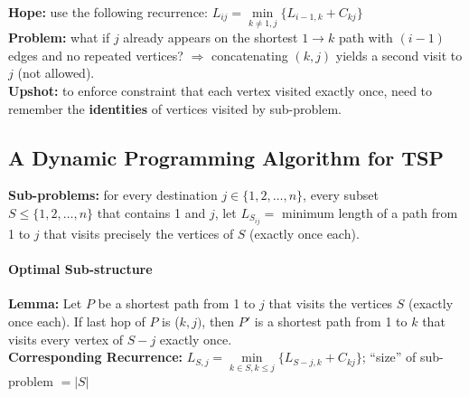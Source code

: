 \documentclass{scrartcl}
\begin{document}
{\bf Hope: } use the following recurrence: $L_{ij} =\min \limits_{k \neq 1, j}
\{L_{i-1,k} + C_{kj}\}$ \\
{\bf Problem: } what if $j$ already appears on the shortest $1 \rightarrow k$
path with $(i-1)$ edges and no repeated vertices? $\Rightarrow$ concatenating
$(k, j)$ yields a second visit to $j$ (not allowed).\\
{\bf Upshot: } to enforce constraint that each vertex visited exactly once, need
to remember the {\bf identities } of vertices visited by sub-problem.\\
\subsection{A Dynamic Programming Algorithm for TSP}
\label{sec:17-5}
{\bf Sub-problems: } for every destination $j \in \{1, 2, \dots, n\}$, every
subset $S \leq \{1, 2, \dots, n\}$ that contains 1 and $j$, let $L_{S_{ij}} = $
minimum length of a path from 1 to $j$ that visits precisely the vertices of $S$
(exactly once each).

\paragraph{Optimal Sub-structure}
{\bf Lemma: } Let $P$ be a shortest path from 1 to $j$ that visits the vertices
$S$ (exactly once each). If last hop of $P$ is ($k,j)$, then $P'$ is a shortest
path from 1 to $k$ that visits every vertex of $S - j$ exactly once.\\
{\bf Corresponding Recurrence: } $L_{S,j} = \min \limits_{k \in S, k \leq j}
\{ L_{S - j, k} + C_{kj} \}$; ``size'' of sub-problem $= |S|$
\end{document}
